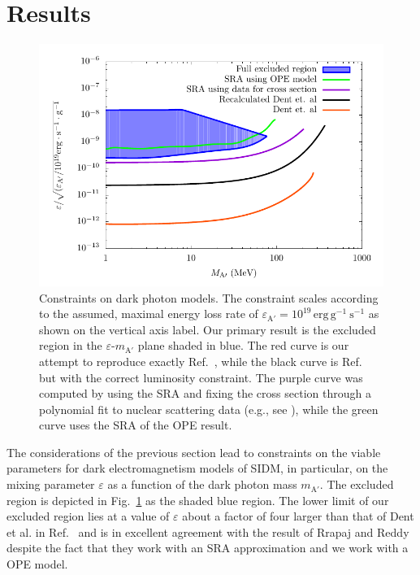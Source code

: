 \documentclass[nofootinbib,prd,superscriptaddress,twocolumn]{revtex4}
\begin{document}
\section{Results}
\label{section:results}



\begin{figure}[th]
\includegraphics[width=14cm]{compiledbounds_edited.pdf}
\caption{
Constraints on dark photon models. The constraint scales according to the assumed, maximal energy loss rate of $\varepsilon_{\mathrm{A}'} = 10^{19}\, \mathrm{erg}\, \mathrm{g}^{-1}\ \mathrm{s}^{-1}$ as shown on the vertical axis label. Our primary result is the excluded region 
in the $\varepsilon$-$m_{\mathrm{A'}}$ plane shaded in blue. The red curve is our attempt to reproduce exactly Ref.~\cite{dent_etal12}, while the black curve is Ref.~\cite{dent_etal12} but with the correct luminosity constraint.  The purple curve was computed by using the SRA and fixing the cross section through a polynomial fit to nuclear scattering data (e.g., see \cite{rrapaj_reddy16}), while the green curve uses the SRA of the OPE result. 
}
\label{fig:constraint}
\end{figure}

The considerations of the previous section lead to constraints on the 
viable parameters for dark electromagnetism models of SIDM, in particular, 
on the mixing parameter $\varepsilon$ as a function of the dark photon mass $m_{\mathrm{A'}}$. 
The excluded region is depicted in Fig.~\ref{fig:constraint} as the shaded blue region. The 
lower limit of our excluded region lies at a value of $\varepsilon$ about a factor of four 
larger than that of Dent et al. in Ref.~\cite{dent_etal12} and is in excellent agreement 
with the result of Rrapaj and Reddy \cite{rrapaj_reddy16} despite the fact that they work 
with an SRA approximation and we work with a OPE model.
\end{document}
